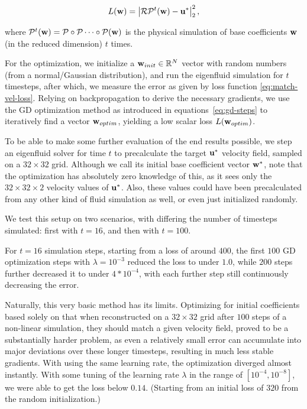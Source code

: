 \begin{equation}\label{eq:match-vel-loss}
  L(\vb{w}) = \left|
  \mathcal{R}\mathcal{P}^{t}(\vb{w}) - \vb{u}^*
  \right|_2^2,
\end{equation}

where $\mathcal{P}^t(\vb{w}) = \mathcal{P} \circ \mathcal{P} \dots \circ
\mathcal{P}(\vb{w})$ is the physical simulation of base coefficients $\vb{w}$
(in the reduced dimension) $t$ times.

For the optimization, we initialize a $\vb{w}_{init} \in \mathbb{R}^N$
vector with random numbers (from a normal/Gaussian distribution), and run the
eigenfluid simulation for $t$ timesteps, after which, we measure the error as
given by loss function \eqref{eq:match-vel-loss}. Relying on backpropagation to
derive the necessary gradients, we use the \ac{GD} optimization method as
introduced in equations~\eqref{eq:gd-steps} to iteratively find a vector
$\vb{w}_{optim}$, yielding a low scalar loss $L(\vb{w}_{optim})$.

To be able to make some further evaluation of the end results possible, we step
an eigenfluid solver for time $t$ to precalculate the target $\vb{u}^*$
velocity field, sampled on a $32\times32$ grid. Although we call its initial
base coefficient vector $\vb{w}^*$, note that the optimization has absolutely
zero knowledge of this, as it sees only the $32\times32\times2$ velocity values
of $\vb{u}^*$. Also, these values could have been precalculated from any other
kind of fluid simulation as well, or even just initialized randomly.

We test this setup on two scenarios, with differing the number of timesteps
simulated: first with $t=16$, and then with $t=100$.

For $t=16$ simulation steps, starting from a loss of around $400$, the first
$100$ \ac{GD} optimization steps with $\lambda=10^{-3}$ reduced the loss to
under $1.0$, while $200$ steps further decreased it to under $4*10^{-4}$, with
each further step still continuously decreasing the error. 

Naturally, this very basic method has its limits.  Optimizing for initial
coefficients based solely on that when reconstructed on a $32\times32$ grid
after $100$ steps of a non-linear simulation, they should match a given velocity
field, proved to be a substantially harder problem, as even a relatively small
error can accumulate into major deviations over these longer timesteps,
resulting in much less stable gradients. With using the same learning rate, the
optimization diverged almost instantly. With some tuning of the learning rate
$\lambda$ in the range of $[10^{-4}, 10^{-8}]$, we were able to get the loss
below $0.14$.  (Starting from an initial loss of $320$ from the random
initialization.) 

